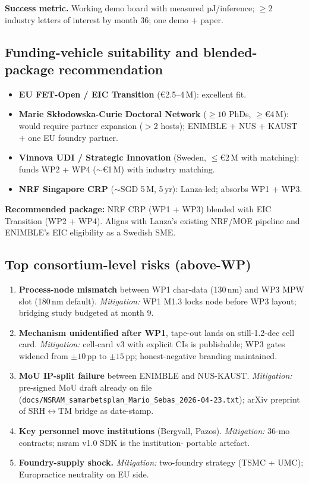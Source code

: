 \textbf{Success metric.} Working demo board with measured pJ/inference;
$\geq\!2$ industry letters of interest by month 36; one demo + paper.

\subsection{Funding-vehicle suitability and blended-package recommendation}

\begin{itemize}[leftmargin=1.4em, topsep=2pt, itemsep=1pt]
\item \textbf{EU FET-Open / EIC Transition} (\euro 2.5--4\,M): excellent
fit.
\item \textbf{Marie Sk{\l}odowska-Curie Doctoral Network}
($\geq\!10$ PhDs, $\geq$\euro 4\,M): would require partner expansion
($>$2 hosts); ENIMBLE $+$ NUS $+$ KAUST $+$ one EU foundry partner.
\item \textbf{Vinnova UDI / Strategic Innovation} (Sweden, $\leq$\euro 2\,M
with matching): funds WP2 + WP4 ($\sim$\euro 1\,M) with industry
matching.
\item \textbf{NRF Singapore CRP} ($\sim$SGD 5\,M, 5\,yr): Lanza-led;
absorbs WP1 + WP3.
\end{itemize}

\textbf{Recommended package:} NRF CRP (WP1 + WP3) blended with EIC
Transition (WP2 + WP4). Aligns with Lanza's existing NRF/MOE pipeline
and ENIMBLE's EIC eligibility as a Swedish SME.

\subsection{Top consortium-level risks (above-WP)}

\begin{enumerate}[leftmargin=1.4em, topsep=2pt, itemsep=1pt]
\item \textbf{Process-node mismatch} between WP1 char-data (130\,nm) and
WP3 MPW slot (180\,nm default). \emph{Mitigation:} WP1 M1.3 locks node
before WP3 layout; bridging study budgeted at month 9.
\item \textbf{Mechanism unidentified after WP1}, tape-out lands on
still-1.2-dec cell card. \emph{Mitigation:} cell-card v3 with explicit
CIs is publishable; WP3 gates widened from $\pm 10$\,pp to $\pm 15$\,pp;
honest-negative branding maintained.
\item \textbf{MoU IP-split failure} between ENIMBLE and NUS-KAUST.
\emph{Mitigation:} pre-signed MoU draft already on file
(\texttt{docs/NSRAM\_samarbetsplan\_Mario\_Sebas\_2026-04-23.txt});
arXiv preprint of SRH$\leftrightarrow$TM bridge as date-stamp.
\item \textbf{Key personnel move institutions} (Bergvall, Pazos).
\emph{Mitigation:} 36-mo contracts; nsram v1.0 SDK is the institution-
portable artefact.
\item \textbf{Foundry-supply shock.} \emph{Mitigation:} two-foundry
strategy (TSMC + UMC); Europractice neutrality on EU side.
\end{enumerate}

